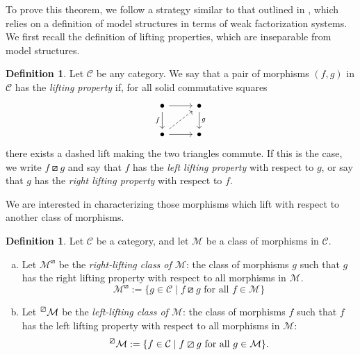 \documentclass{amsart}
\newcommand{\catC}{\mathcal{C}}
\newcommand{\llp}[1]{\prescript{\boxslash}{}{#1}}
\newcommand{\rlp}[1]{{#1}^{\boxslash}}
\numberwithin{equation}{section}
\theoremstyle{definition}
\newtheorem{definition}[equation]{Definition}
\begin{document}
To prove this theorem, we follow a strategy similar to that outlined in \cite{ACB2025}, which relies on a definition of model structures in terms of weak factorization systems. We first recall the definition of lifting properties, which are inseparable from model structures.


\begin{definition}
	Let $\catC$ be any category. We say that a pair of morphisms $(f,g)$ in $\catC$ has the \emph{lifting property} if, for all solid commutative squares
	\[\begin{tikzcd}[ampersand replacement=\&]
			\bullet \& \bullet \\
			\bullet \& \bullet
			\arrow[from=1-1, to=1-2]
			\arrow["f"', from=1-1, to=2-1]
			\arrow["g", from=1-2, to=2-2]
			\arrow[dashed, from=2-1, to=1-2]
			\arrow[from=2-1, to=2-2]
		\end{tikzcd}\]
	there exists a dashed lift making the two triangles commute. If this is the case, we write $f \boxslash g$ and say that $f$ has the \emph{left lifting property} with respect to $g$, or say that $g$ has the \emph{right lifting property} with respect to $f$.
\end{definition}

We are interested in characterizing those morphisms which lift with respect to another class of morphisms.

\begin{definition}
	\label{def of lifting classes}
	Let $\catC$ be a category, and let $\mathcal{M}$ be a class of morphisms in $\catC$.
	\begin{enumerate}[(a)]
		\item Let $\rlp{\mathcal M}$ be the \emph{right-lifting class of $\mathcal{M}$}: the class of morphisms $g$ such that $g$ has the right lifting property with respect to all morphisms in $\mathcal{M}$.
		      \[
			      \rlp{\mathcal{M}} := \{g \in \catC \mid f \boxslash g \text{ for all } f \in \mathcal M\}
		      \]
		\item Let $\llp{\mathcal M}$ be the \emph{left-lifting class of $\mathcal{M}$}: the class of morphisms $f$ such that $f$ has the left lifting property with respect to all morphisms in $\mathcal M$:
		      \[
			      \llp{\mathcal{M}} := \{f \in \catC \mid f \boxslash g \text{ for all } g \in \mathcal M\}.
		      \]
	\end{enumerate}
\end{definition}
\end{document}

